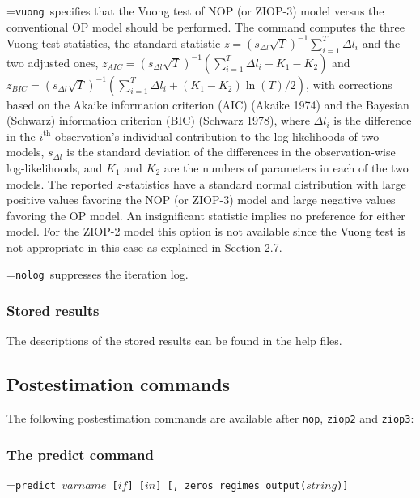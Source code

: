 \documentclass[letterpaper,fleqn,12pt]{article}
\begin{document}
\smallskip

\hangindent=\parindent\noindent \texttt{vuong }specifies that the Vuong test
of NOP (or ZIOP-3) model versus the conventional OP model should be
performed. The command computes the three Vuong test statistics, the
standard statistic $z=(s_{\Delta l}\sqrt{T})^{-1}\sum_{i=1}^{T}\Delta l_{i}$
and the two adjusted ones, $z_{AIC}=(s_{\Delta l}\sqrt{T})^{-1}\left(
\sum_{i=1}^{T}\Delta l_{i}+K_{1}-K_{2}\right) $ and $z_{BIC}=(s_{\Delta l}%
\sqrt{T})^{-1}\left( \sum_{i=1}^{T}\Delta l_{i}+(K_{1}-K_{2})\ln
(T)/2\right) $, with corrections based on the Akaike information criterion
(AIC) (Akaike 1974) and the Bayesian (Schwarz) information criterion (BIC)
(Schwarz 1978), where $\Delta l_{i}$ is the difference in the $i^{\text{th}}$
observation's individual contribution to the log-likelihoods of two models, $%
s_{\Delta l}$ is the standard deviation of the differences in the
observation-wise log-likelihoods, and $K_{1}$ and $K_{2}$ are the numbers of
parameters in each of the two models. The reported $z$-statistics have a
standard normal distribution with large positive values favoring the NOP (or
ZIOP-3) model and large negative values favoring the OP model. An
insignificant statistic implies no preference for either model. For the
ZIOP-2 model this option is not available since the Vuong test is not
appropriate in this case as explained in Section 2.7.

\smallskip

\hangindent=\parindent\noindent \texttt{nolog }suppresses the iteration log.

\subsubsection*{Stored results}

The descriptions of the stored results can be found in the help files.

\subsection{Postestimation commands}

The following postestimation commands are available after \texttt{nop}, 
\texttt{ziop2} and \texttt{ziop3}:

\subsubsection*{The predict command}

\hangindent=\parindent\noindent \texttt{predict $varname$ [$if$] [$in$] [,
zeros regimes output($string$)]}
\end{document}
